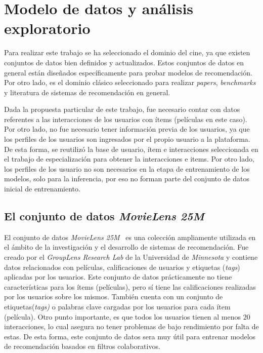 \documentclass[11pt,a4paper,twoside]{thesis}
\begin{document}
\chapter{Modelo de datos y análisis exploratorio}

Para realizar este trabajo se ha seleccionado el dominio del cine, ya que existen
conjuntos de datos bien definidos y actualizados. Estos conjuntos de datos en
general están diseñados específicamente para probar modelos de recomendación. Por otro lado, es
el dominio clásico seleccionado para realizar \textit{papers}, \textit{benchmarks} y literatura de sistemas de recomendación
en general.

Dada la propuesta particular de este trabajo, fue necesario contar con datos referentes a las
interacciones de los usuarios con ítems (películas en este caso). Por otro lado, no fue necesario tener información previa de los usuarios, ya que los perfiles de los usuarios son ingresados por el propio usuario a la plataforma. De esta forma, se reutilizó la base de usuario, ítem e interacciones seleccionada en el trabajo de especialización \cite{src} para obtener la interacciones e items. Por otro lado, los perfiles de los usuario no son necesarios en la etapa de entrenamiento de los modelos, solo para la inferencia, por eso no forman parte del conjunto de datos inicial de entrenamiento.

\section{El conjunto de datos \textit{MovieLens 25M}}

El conjunto de datos \textit{MovieLens 25M}~\cite{movielens} es una colección ampliamente utilizada en el ámbito de la investigación y el desarrollo de sistemas de recomendación. Fue creado por el \textit{GroupLens Research Lab} de la Universidad de \textit{Minnesota} y contiene datos relacionados con películas, calificaciones de usuarios y etiquetas (\textit{tags}) aplicadas por los usuarios. Este conjunto de datos prácticamente no tiene características
para los ítems (películas), pero sí tiene las calificaciones realizadas por los
usuarios sobre los mismos. También cuenta con un conjunto de etiquetas(\textit{tags)} o palabras clave
cargadas por los usuarios para cada ítem (película). Otro punto importante, es
que todos los usuarios tienen al menos $20$ interacciones, lo cual asegura no
tener problemas de bajo rendimiento por falta de estas. De esta forma,
este conjunto de datos sera muy útil para entrenar modelos de recomendación
basados en filtros colaborativos.
\end{document}
